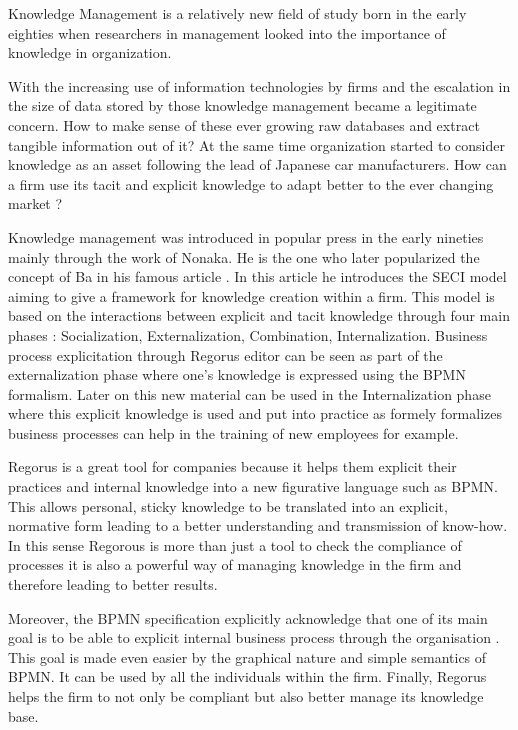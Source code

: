 \documentclass[10pt]{report}
\begin{document}
Knowledge Management is a relatively new field of study born in the early eighties when researchers in management looked into the importance of knowledge in organization.\autocite{Wiig19971}

With the increasing use of information technologies by firms and the escalation in the size of data stored by those knowledge management became a legitimate concern. How to make sense of these ever growing raw databases and extract tangible information out of it? At the same time organization started to consider knowledge as an asset following the lead of Japanese car manufacturers.\autocite{Koenig08} How can a firm use its tacit and explicit knowledge to adapt better to the ever changing market ?

Knowledge management was introduced in popular press in the early nineties mainly through the work of Nonaka. \autocite{nonaka1991knowledge} He is the one who later popularized the concept of Ba in his famous article \autocite{Nonaka_Konno_1998}. In this article he introduces the SECI model aiming to give a framework for knowledge creation within a firm. This model is based on the interactions between explicit and tacit knowledge through four main phases : Socialization, Externalization, Combination, Internalization. Business process explicitation through Regorus editor can be seen as part of the externalization phase where one's knowledge is expressed using the BPMN formalism. Later on this new material can be used in the Internalization phase where this explicit knowledge is used and put into practice as formely formalizes business processes can help in the training of new employees for example.

Regorus is a great tool for companies because it helps them explicit their practices and internal knowledge into a new figurative language such as BPMN. This allows personal, sticky knowledge to be translated into an explicit, normative form leading to a better understanding and transmission of know-how. In this sense Regorous is more than just a tool to check the compliance of processes it is also a powerful way of managing knowledge in the firm and therefore leading to better results.

Moreover, the BPMN specification explicitly acknowledge that one of its main goal is to be able to explicit internal business process through the organisation \cite{BPMNstandardDocument}. This goal is made even easier by the graphical nature and simple semantics of BPMN. It can be used by all the individuals within the firm. Finally, Regorus helps the firm to not only be compliant but also better manage its knowledge base.
\end{document}
